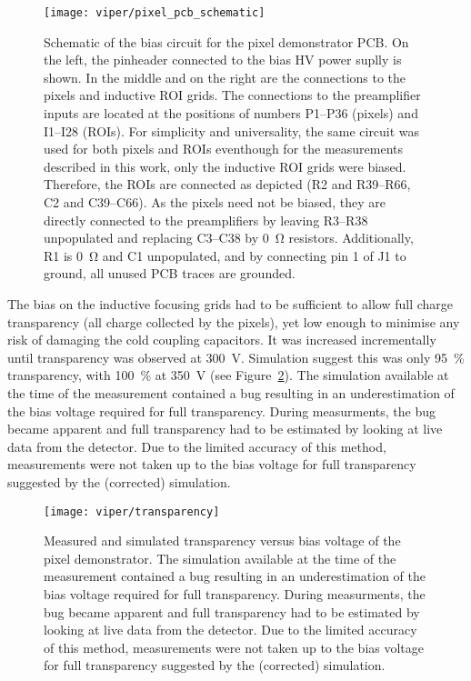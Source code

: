 \begin{figure}[htb]
	\centering
	\texttt{[image: viper/pixel\_pcb\_schematic]}
	\caption{Schematic of the bias circuit for the \AC{} pixel demonstrator PCB.
	On the left, the pinheader connected to the bias HV power suplly is shown. In the middle and on the right are the connections to the pixels and inductive ROI grids.
	The connections to the preamplifier inputs are located at the positions of numbers P1--P36 (pixels) and I1--I28 (ROIs).
	For simplicity and universality, the same circuit was used for both pixels and ROIs eventhough for the measurements described in this work, only the inductive ROI grids were biased.
	Therefore, the ROIs are connected as depicted (R2 and R39--R66, C2 and C39--C66).
	As the pixels need not be biased, they are directly connected to the preamplifiers by leaving R3--R38 unpopulated and replacing C3--C38 by \SI{0}{\ohm} resistors.
	Additionally, R1 is \SI{0}{\ohm} and C1 unpopulated, and by connecting pin 1 of J1 to ground, all unused PCB traces are grounded.}
	\label{fig:viper_pcb_schematic}
\end{figure}

The bias on the inductive focusing grids had to be sufficient to allow full charge transparency (all charge collected by the pixels), yet low enough to minimise any risk of damaging the cold coupling capacitors.
It was increased incrementally until transparency was observed at \SI{300}{\volt}. 
Simulation suggest this was only \SI{95}{\percent} transparency, with \SI{100}{\percent} at \SI{350}{\volt} (see Figure~\ref{fig:viper_transparency}).
The simulation available at the time of the measurement contained a bug resulting in an underestimation of the bias voltage required for full transparency.
During measurments, the bug became apparent and full transparency had to be estimated by looking at live data from the detector.
Due to the limited accuracy of this method, measurements were not taken up to the bias voltage for full transparency suggested by the (corrected) simulation.~\cite{francypants}

\begin{figure}[htb]
	\centering
	\texttt{[image: viper/transparency]}
	\caption{Measured and simulated transparency versus bias voltage of the \AC{} pixel demonstrator.
	The simulation available at the time of the measurement contained a bug resulting in an underestimation of the bias voltage required for full transparency.
	During measurments, the bug became apparent and full transparency had to be estimated by looking at live data from the detector.
	Due to the limited accuracy of this method, measurements were not taken up to the bias voltage for full transparency suggested by the (corrected) simulation.~\cite{francypants}}
	\label{fig:viper_transparency}
\end{figure}


